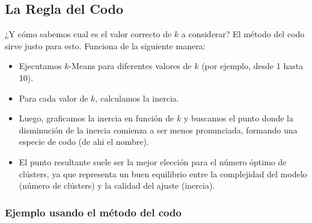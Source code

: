 \documentclass[
  spanish,
  letterpaper,
  DIV=11,
  numbers=noendperiod]{scrreprt}
\providecommand{\tightlist}{%
  \setlength{\itemsep}{0pt}\setlength{\parskip}{0pt}}
\begin{document}
\subsection{La Regla del Codo}\label{la-regla-del-codo}

¿Y cómo sabemos cual es el valor correcto de \(k\) a considerar? El
método del codo sirve justo para esto. Funciona de la siguiente manera:

\begin{itemize}
\tightlist
\item
  Ejecutamos \(k\)-Means para diferentes valores de \(k\) (por ejemplo,
  desde 1 hasta 10).
\item
  Para cada valor de \(k\), calculamos la inercia.
\item
  Luego, graficamos la inercia en función de \(k\) y buscamos el punto
  donde la disminución de la inercia comienza a ser menos pronunciada,
  formando una especie de codo (de ahi el nombre).
\item
  El punto resultante suele ser la mejor elección para el número óptimo
  de clústers, ya que representa un buen equilibrio entre la complejidad
  del modelo (número de clústers) y la calidad del ajuste (inercia).
\end{itemize}

\subsubsection{Ejemplo usando el método del
codo}\label{ejemplo-usando-el-muxe9todo-del-codo}
\end{document}
